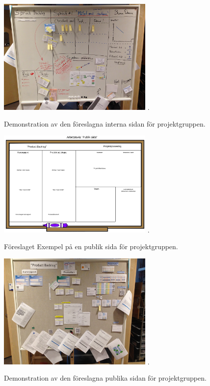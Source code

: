 \documentclass[conference,a4paper]{IEEEtran}
\begin{document}
\begin{figure}[H]
\centering
\includegraphics[width=3in]{forslagriktigsprint}
\DeclareGraphicsExtensions.
\caption{Demonstration av den föreslagna interna sidan för projektgruppen.}
\label{forslagriktigsprint}
\end{figure}

\begin{figure}[H]
\centering
\includegraphics[width=3in]{forslagproductbacklog}
\DeclareGraphicsExtensions.
\caption{Föreslaget Exempel på en publik sida för projektgruppen.}
\label{forslagproductbacklog}
\end{figure}

\begin{figure}[H]
\centering
\includegraphics[width=3in]{forslagriktigproduct}
\DeclareGraphicsExtensions.
\caption{Demonstration av den föreslagna publika sidan för projektgruppen.}
\label{forslagriktigproduct}
\end{figure}
\end{document}
